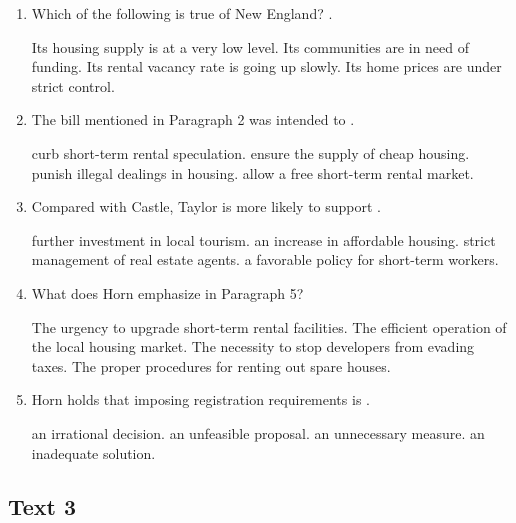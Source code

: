 \begin{enumerate}[resume]

\item

Which of the following is true of New England? \lineread.

\fourchoices
{Its housing supply is at a very low level.}
{Its communities are in need of funding.}
{Its rental vacancy rate is going up slowly.}
{Its home prices are under strict control.}

\item

The bill mentioned in Paragraph 2 was intended to \lineread.

\fourchoices
{curb short-term rental speculation.}
{ensure the supply of cheap housing.}
{punish illegal dealings in housing.}
{allow a free short-term rental market.}

\item

Compared with Castle, Taylor is more likely to support \lineread.

\fourchoices
{further investment in local tourism.}
{an increase in affordable housing.}
{strict management of real estate agents.}
{a favorable policy for short-term workers.}

\item

What does Horn emphasize in Paragraph 5?

\fourchoices
{The urgency to upgrade short-term rental facilities.}
{The efficient operation of the local housing market.}
{The necessity to stop developers from evading taxes.}
{The proper procedures for renting out spare houses.}

\item

Horn holds that imposing registration requirements is \lineread.

\fourchoices
{an irrational decision.}
{an unfeasible proposal.}
{an unnecessary measure.}
{an inadequate solution.}

\end{enumerate}


\newpage
\subsection{Text 3}

